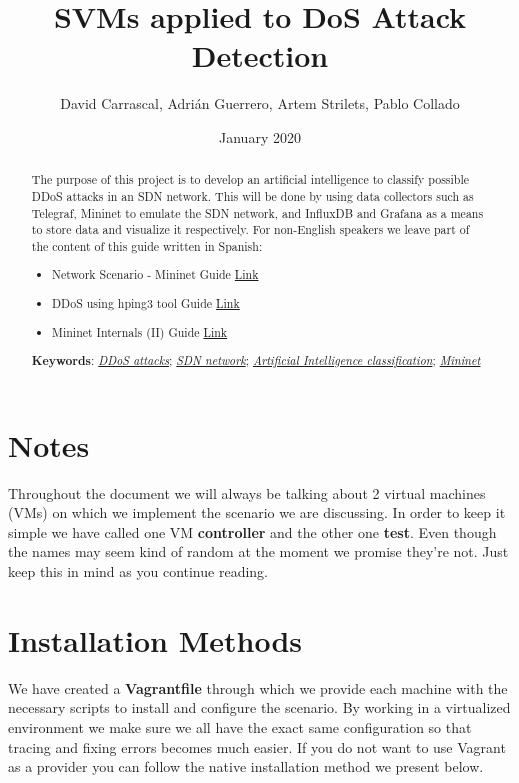 \documentclass[12pt]{report}
\title{SVMs applied to DoS Attack Detection}
\author{David Carrascal, Adrián Guerrero, Artem Strilets, Pablo Collado}
\date{January 2020}
\begin{document}
	\begin{titlepage}
		\maketitle
	\end{titlepage}

	\begin{abstract}
		The purpose of this project is to develop an artificial intelligence to classify possible DDoS attacks in an SDN network. This will be done by using data collectors such as Telegraf, Mininet to emulate the SDN network, and InfluxDB and Grafana as a means to store data and visualize it respectively. For non-English speakers we leave part of the content of this guide written in Spanish:

		\begin{itemize}
			\item Network Scenario - Mininet Guide \href{https://hackmd.io/@davidcawork/r1fZC-nRS}{Link}
			\item DDoS using hping3 tool Guide \href{https://hackmd.io/@davidcawork/HJ_D7jA0r}{Link}
			\item Mininet Internals (II) Guide \href{https://hackmd.io/@davidcawork/SyrwHoNJL}{Link}
		\end{itemize}

		\textbf{Keywords}: \href{https://www.digitalattackmap.com/}{\textit{DDoS attacks}}; \href{https://www.opennetworking.org/sdn-definition}{\textit{SDN network}}; \href{https://www.sciencedirect.com/science/article/abs/pii/016974399500050X}{\textit{Artificial Intelligence classification}}; \href{https://mininet.org}{\textit{Mininet}}
	\end{abstract}

	\tableofcontents

	\section{Notes}
		Throughout the document we will always be talking about 2 virtual machines (VMs) on which we implement the scenario we are discussing. In order to keep it simple we have called one VM \textbf{controller} and the other one \textbf{test}. Even though the names may seem kind of random at the moment we promise they're not. Just keep this in mind as you continue reading.

	\section{Installation Methods}
		We have created a \textbf{Vagrantfile} through which we provide each machine with the necessary scripts to install and configure the scenario. By working in a virtualized environment we make sure we all have the exact same configuration so that tracing and fixing errors becomes much easier. If you do not want to use Vagrant as a provider you can follow the native installation method we present below.
\end{document}

